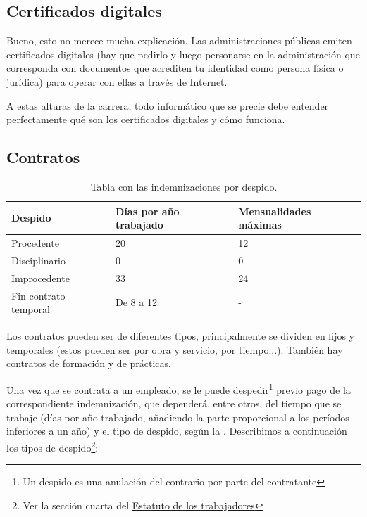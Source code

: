 \documentclass[nochap,palatino,shortheader]{apuntes}
\newcommand{\study}[1]{#1} \newcommand{\substudy}[1]{#1}
\begin{document}
\subsection{Certificados digitales}

Bueno, esto no merece mucha explicación. Las administraciones públicas emiten certificados digitales (hay que pedirlo y luego personarse en la administración que corresponda con documentos que acrediten tu identidad como persona física o jurídica) para operar con ellas a través de Internet.

A estas alturas de la carrera, todo informático que se precie debe entender perfectamente qué son los certificados digitales y cómo funciona.

\subsection{Contratos}

\begin{table}[hbtp]
\centering
\begin{tabular}{l|l|l}
\textbf{Despido} & \textbf{Días por año trabajado} & \textbf{Mensualidades máximas} \\ \toprule
Procedente & 20 & 12 \\
Disciplinario & 0 & 0 \\
Improcedente & 33 & 24 \\
Fin contrato temporal & De 8 a 12 & - \\
\end{tabular}
\caption{Tabla con las indemnizaciones por despido.}
\label{tab:Despido}
\end{table}

Los contratos pueden ser de diferentes tipos, principalmente se dividen en fijos y temporales (estos pueden ser por obra y servicio, por tiempo...). También hay contratos de formación y de prácticas.

Una vez que se contrata a un empleado, se le puede despedir\footnote{Un despido es una anulación del contrario por parte del contratante} previo pago de la correspondiente indemnización, que dependerá, entre otros, del tiempo que se trabaje (días por año trabajado, añadiendo la parte proporcional a los períodos inferiores a un año) y el tipo de despido, según la .
Describimos a continuación los \study{tipos de despido}\footnote{Ver la sección cuarta del \href{https://www.boe.es/buscar/act.php?id=BOE-A-1995-7730&tn=1&p=20151024}{Estatuto de los trabajadores}}:
\end{document}
